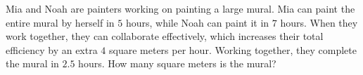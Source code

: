 Mia and Noah are painters working on painting a large mural. Mia can paint the entire mural by herself in $5$ hours, while Noah can paint it in $7$ hours. When they work together, they can collaborate effectively, which increases their total efficiency by an extra $4$ square meters per hour. Working together, they complete the mural in $2.5$ hours. How many square meters is the mural?
